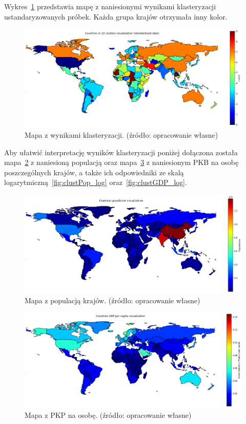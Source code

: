 \documentclass[11pt]{report}
\begin{document}
    Wykres~\ref{fig:clust10std} przedstawia mapę z naniesionymi wynikami klasteryzacji ustandaryzowanych próbek.
    Każda grupa krajów otrzymała inny kolor.

    \begin{figure}[!htp]
        \centering
        \includegraphics[width=\linewidth]{fig/CLUST/10clusterMap_std.png}
        \caption{Mapa z wynikami klasteryzacji. (źródło: opracowanie własne)}
        \label{fig:clust10std}
    \end{figure}

    Aby ułatwić interpretację wyników klasteryzacji poniżej dołączona została mapa~\ref{fig:clustPop} z naniesioną populacją oraz mapa~\ref{fig:clustGDP} z naniesionym PKB na osobę poszczególnych krajów, a także ich odpowiedniki ze skalą logarytmiczną~\ref{fig:clustPop_log} oraz~\ref{fig:clustGDP_log}.

    \begin{figure}[!htp]
        \centering
        \includegraphics[width=\linewidth]{fig/CLUST/population.png}
        \caption{Mapa z populacją krajów. (źródło: opracowanie własne)}
        \label{fig:clustPop}
    \end{figure}

    \begin{figure}[!htp]
        \centering
        \includegraphics[width=\linewidth]{fig/CLUST/gdp.png}
        \caption{Mapa z PKP na osobę. (źródło: opracowanie własne)}
        \label{fig:clustGDP}
    \end{figure}
\end{document}
